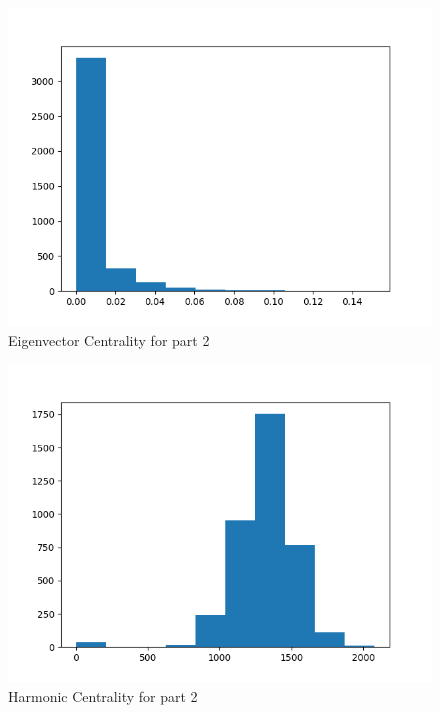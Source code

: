 \documentclass{article}
\begin{document}
\begin{figure}
    \centering
    \includegraphics[width=\textwidth,height=\textheight,keepaspectratio]{eigenvector_centrality.png}
    \caption{Eigenvector Centrality for part 2}
    \label{fig:part2eignenvector}
\end{figure}

\begin{figure}
    \centering
    \includegraphics[width=\textwidth,height=\textheight,keepaspectratio]{harmonic_centrality.png}
    \caption{Harmonic Centrality for part 2}
    \label{fig:part2harmonic}
\end{figure}
\end{document}
